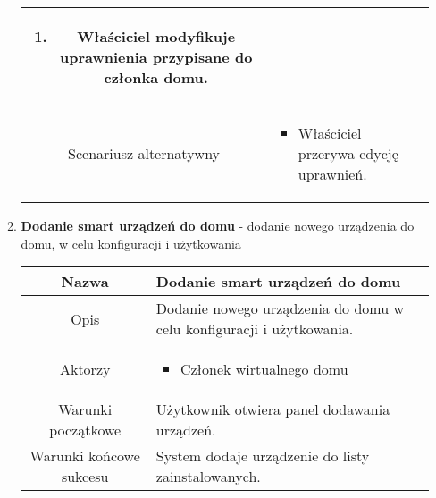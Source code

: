 \documentclass{article}
\begin{document}
\begin{enumerate}
\begin{enumerate}
\begin{table}[H]
\begin{tabular}{|c|p{7cm}|}
\begin{enumerate}
\item Właściciel modyfikuje uprawnienia przypisane do członka domu.\end{enumerate} \\
						\hline
						Scenariusz alternatywny & \begin{itemize}\item Właściciel przerywa edycję uprawnień.\end{itemize}                                                                                                                           \\
						\hline
					\end{tabular}
				\end{table}

			\item \textbf{Dodanie smart urządzeń do domu} - dodanie nowego urządzenia
				do domu, w celu konfiguracji i użytkowania
				\begin{table}[H]
					\centering
					\begin{tabular}{|c|p{7cm}|}
						\hline
						Nazwa                   & \textbf{Dodanie smart urządzeń do domu}                                                                                                                                                                                                                     \\
						\hline
						Opis                    & Dodanie nowego urządzenia do domu w celu konfiguracji i użytkowania.                                                                                                                                                                                        \\
						\hline
						Aktorzy                 & \begin{itemize}\item Członek wirtualnego domu\end{itemize}                                                                                                                                                                                                  \\
						\hline
						Warunki początkowe      & Użytkownik otwiera panel dodawania urządzeń.                                                                                                                                                                                                                \\
						\hline
						Warunki końcowe sukcesu & System dodaje urządzenie do listy zainstalowanych.                                                                                                                                                                                                          \\

\end{tabular}
\end{table}
\end{enumerate}
\end{enumerate}
\end{document}
